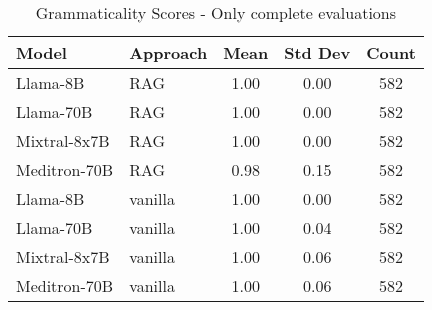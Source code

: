 \begin{table}[h]
\centering
\begin{tabular}{llccc}
\toprule
Model & Approach & Mean & Std Dev & Count \\
\midrule
Llama-8B & RAG & 1.00 & 0.00 & 582 \\
Llama-70B & RAG & 1.00 & 0.00 & 582 \\
Mixtral-8x7B & RAG & 1.00 & 0.00 & 582 \\
Meditron-70B & RAG & 0.98 & 0.15 & 582 \\
Llama-8B & vanilla & 1.00 & 0.00 & 582 \\
Llama-70B & vanilla & 1.00 & 0.04 & 582 \\
Mixtral-8x7B & vanilla & 1.00 & 0.06 & 582 \\
Meditron-70B & vanilla & 1.00 & 0.06 & 582 \\
\bottomrule
\end{tabular}
\caption{Grammaticality Scores - Only complete evaluations}
\label{tab:grammaticality_complete}
\end{table}